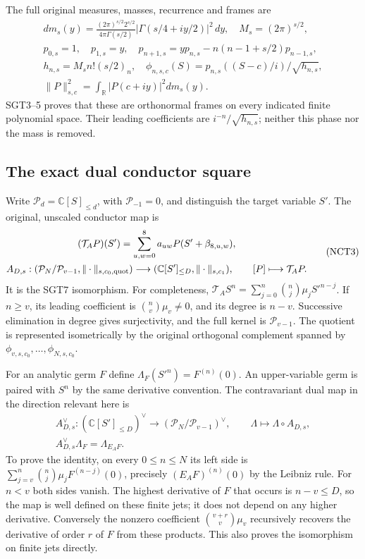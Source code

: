 \documentclass[11pt,a4paper]{article}
\begin{document}
The full original measures, masses, recurrence and frames are
\[
\begin{gathered}
 dm_s(y)=\frac{(2\pi)^{s/2}2^{s/2}}{4\pi\Gamma(s/2)}
        |\Gamma(s/4+iy/2)|^2\,dy,
 \quad M_s=(2\pi)^{s/2},\\
 p_{0,s}=1,\quad p_{1,s}=y,\quad
 p_{n+1,s}=yp_{n,s}-n(n-1+s/2)p_{n-1,s},\\
 h_{n,s}=M_sn!(s/2)_n,\quad
 \phi_{n,s,c}(S)=p_{n,s}((S-c)/i)/\sqrt{h_{n,s}},\\
 \|P\|_{s,c}^2=\int_{\mathbb R}|P(c+iy)|^2dm_s(y).
\end{gathered}\tag{NCT2}
\]
SGT3--5 proves that these are orthonormal frames on every indicated
finite polynomial space.  Their leading coefficients are
\(i^{-n}/\sqrt{h_{n,s}}\); neither this phase nor the mass is removed.

\subsection{The exact dual conductor square}

Write \(\mathcal P_d=\mathbb C[S]_{\le d}\), with
\(\mathcal P_{-1}=0\), and distinguish the target variable \(S'\).
The original, unscaled conductor map is
\[
\begin{gathered}
 (\mathcal T_AP)(S')=\sum_{u,w=0}^{8}a_{uw}
                       P(S'+\beta_{8,u,w}),\\
 A_{D,s}: (\mathcal P_N/\mathcal P_{v-1},\|\cdot\|_{s,c_0,\rm quot})
          \longrightarrow(\mathbb C[S']_{\le D},\|\cdot\|_{s,c_1}),
 \qquad [P]\longmapsto\mathcal T_AP .
\end{gathered}\tag{NCT3}
\]
It is the SGT7 isomorphism.  For completeness,
\(\mathcal T_AS^n=\sum_{j=0}^n\binom nj\mu_jS'^{n-j}\).
If \(n\ge v\), its leading coefficient is
\(\binom nv\mu_v\ne0\), and its degree is \(n-v\).
Successive elimination in degree gives surjectivity, and the full
kernel is \(\mathcal P_{v-1}\).  The quotient is represented
isometrically by the original orthogonal complement spanned by
\(\phi_{v,s,c_0},\ldots,\phi_{N,s,c_0}\).

For an analytic germ \(F\) define
\(\Lambda_F(S'^n)=F^{(n)}(0)\).  An upper-variable germ is paired
with \(S^n\) by the same derivative convention.  The contravariant
dual map in the direction relevant here is
\[
\begin{gathered}
 A_{D,s}^{\vee}:(\mathbb C[S']_{\le D})^{\vee}
       \longrightarrow(\mathcal P_N/\mathcal P_{v-1})^{\vee},
 \qquad \Lambda\longmapsto\Lambda\circ A_{D,s},\\
 A_{D,s}^{\vee}\Lambda_F=\Lambda_{E_AF}.
\end{gathered}\tag{NCT4}
\]
To prove the identity, on every \(0\le n\le N\) its left side is
\(\sum_{j=v}^n\binom nj\mu_jF^{(n-j)}(0)\), precisely
\((E_AF)^{(n)}(0)\) by the Leibniz rule.  For \(n<v\) both
sides vanish.  The highest derivative of \(F\) that occurs is
\(n-v\le D\), so the map is well defined on these finite jets;
it does not depend on any higher derivative.  Conversely the
nonzero coefficient \(\binom{v+r}{v}\mu_v\) recursively recovers
the derivative of order \(r\) of \(F\) from these products.
This also proves the isomorphism on finite jets directly.
\end{document}
